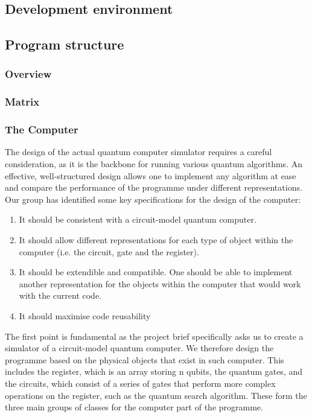 \documentclass[bibliography=totocnumbered]{article}
\theoremstyle{NoticeStyle}
\begin{document}
\subsection{Development environment}

\subsection{Program structure}

%
\subsubsection{Overview}

\subsubsection{Matrix}

\subsubsection{The Computer}
The design of the actual quantum computer simulator requires a careful consideration, as it is the backbone for running various quantum algorithms. An effective, well-structured design allows one to implement any algorithm at ease and compare the performance of the programme under different representations. Our group has identified some key specifications for the design of the computer:
\begin{enumerate}
	\item It should be consistent with a circuit-model quantum computer.
	\item It should allow different representations for each type of object within the computer  (i.e. the circuit, 			gate and the register).
	\item It should be extendible and compatible. One should be able to implement another representation for the objects within the computer that would work with the current code.
	\item It should maximise code reusability
\end{enumerate}
The first point is fundamental as the project brief specifically asks us to create a simulator of a circuit-model quantum computer. We therefore design the programme based on the physical objects that exist in such computer. This includes the register, which is an array storing n qubits, the quantum gates, and the circuits, which consist of a series of gates that perform more complex operations on the register, such as the quantum search algorithm. These form the three main groups of classes for the computer part of the programme.
\end{document}
